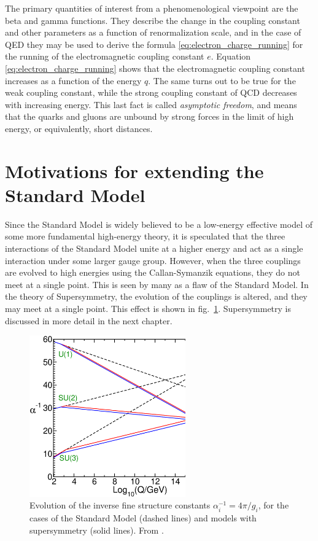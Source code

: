 \documentclass[twoside,english]{uiofysmaster}
\begin{document}
The primary quantities of interest from a phenomenological viewpoint are the beta and gamma functions. They describe the change in the coupling constant and other parameters as a function of renormalization scale, and in the case of QED they may be used to derive the formula \eqref{eq:electron_charge_running} for the running of the electromagnetic coupling constant $e$. Equation \eqref{eq:electron_charge_running} shows that the electromagnetic coupling constant increases as a function of the energy $q$. The same turns out to be true for the weak coupling constant, while the strong coupling constant of QCD decreases with increasing energy. This last fact is called {\it asymptotic freedom}, and means that the quarks and gluons are unbound by strong forces in the limit of high energy, or equivalently, short distances. 





\section[Motivations for extending the Standard Model]{Motivations for extending the\\ Standard Model}

Since the Standard Model is widely believed to be a low-energy effective model of some more fundamental high-energy theory, it is speculated that the three interactions of the Standard Model unite at a higher energy and act as a single interaction under some larger gauge group. However, when the three couplings are evolved to high energies using the Callan-Symanzik equations, they do not meet at a single point. This is seen by many as a flaw of the Standard Model. In the theory of Supersymmetry, the evolution of the couplings is altered, and they may meet at a single point. This effect is shown in fig.\ \ref{fig:coupling_unification}. Supersymmetry is discussed in more detail in the next chapter.
\begin{figure}[hbt]
	\centering
	\includegraphics[width=0.6\textwidth]{figures/susyintro/unification.eps}
	\caption{Evolution of the inverse fine structure constants $\alpha^{-1}_i = 4\pi/g_i$, for the cases of the Standard Model (dashed lines) and models with supersymmetry (solid lines). From \cite{Martin:1997ns}.}
	\label{fig:coupling_unification}
\end{figure}
\end{document}
